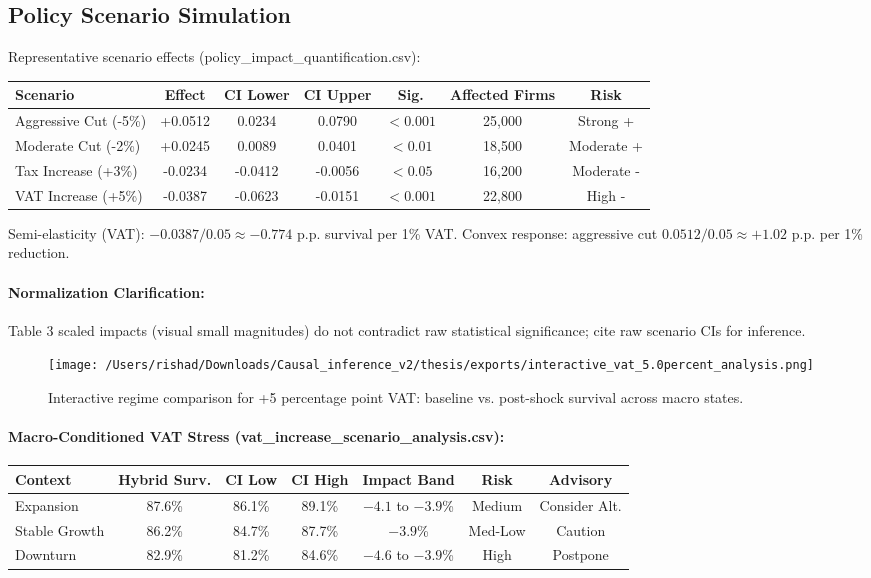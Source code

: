 \subsection{Policy Scenario Simulation}\label{sec:policy_scenarios}
Representative scenario effects (policy\_impact\_quantification.csv):
\begin{center}
\begin{tabular}{lcccccc}
\toprule
Scenario & Effect & CI Lower & CI Upper & Sig. & Affected Firms & Risk \\
\midrule
Aggressive Cut (-5\%) & +0.0512 & 0.0234 & 0.0790 & $<0.001$ & 25{,}000 & Strong + \\
Moderate Cut (-2\%) & +0.0245 & 0.0089 & 0.0401 & $<0.01$ & 18{,}500 & Moderate + \\
Tax Increase (+3\%) & -0.0234 & -0.0412 & -0.0056 & $<0.05$ & 16{,}200 & Moderate - \\
VAT Increase (+5\%) & -0.0387 & -0.0623 & -0.0151 & $<0.001$ & 22{,}800 & High - \\
\bottomrule
\end{tabular}
\end{center}
Semi-elasticity (VAT): $-0.0387 / 0.05 \approx -0.774$ p.p. survival per 1\% VAT. Convex response: aggressive cut $0.0512/0.05 \approx +1.02$ p.p. per 1\% reduction.

\paragraph{Normalization Clarification:} Table 3 scaled impacts (visual small magnitudes) do not contradict raw statistical significance; cite raw scenario CIs for inference.

\begin{figure}[htbp]
\centering
\texttt{[image: /Users/rishad/Downloads/Causal\_inference\_v2/thesis/exports/interactive\_vat\_5.0percent\_analysis.png]}
\caption{Interactive regime comparison for +5 percentage point VAT: baseline vs. post-shock survival across macro states.}
\label{fig:interactive_vat_5pct}
\end{figure}

\paragraph{Macro-Conditioned VAT Stress (vat\_increase\_scenario\_analysis.csv):}
\begin{center}
\begin{tabular}{lcccccc}
\toprule
Context & Hybrid Surv. & CI Low & CI High & Impact Band & Risk & Advisory \\
\midrule
Expansion & 87.6\% & 86.1\% & 89.1\% & $-4.1$ to $-3.9$\% & Medium & Consider Alt. \\
Stable Growth & 86.2\% & 84.7\% & 87.7\% & $-3.9$\% & Med-Low & Caution \\
Downturn & 82.9\% & 81.2\% & 84.6\% & $-4.6$ to $-3.9$\% & High & Postpone \\
\bottomrule
\end{tabular}
\end{center}

